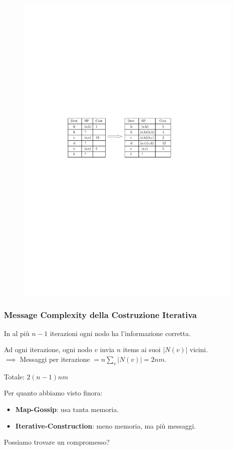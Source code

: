 \documentclass[10pt,xcolor=dvipsnames]{beamer}
\begin{document}
\begin{frame}
	\begin{figure}[h]
	\centering
		\includegraphics[width=.85\linewidth]{routing_table_local_update_s.pdf}
	\end{figure}
\end{frame}

\begin{frame}
	\frametitle{Message Complexity della Costruzione Iterativa}
	In al più $n-1$ iterazioni ogni nodo ha l'informazione corretta.
	\vfill

	\pause
	Ad ogni iterazione, ogni nodo $v$ invia $n$ items ai suoi $|N(v)|$ vicini.\\
	$\implies$ Messaggi per iterazione $= n \sum_v |N(v)|=2nm$.
	\vfill

	\pause
	Totale: $2(n-1)nm$
\end{frame}

\begin{frame}{}
	Per quanto abbiamo visto finora:
	\begin{itemize}
		\item \textbf{Map-Gossip}: usa tanta memoria.
		\item \textbf{Iterative-Construction}: meno memoria, ma più messaggi.
	\end{itemize}
	\vfill

	Possiamo trovare un compromesso?
\end{frame}
\end{document}
